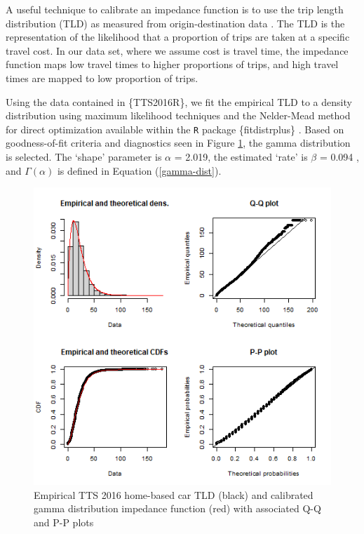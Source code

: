 \documentclass[Royal,times,sageh]{sagej}
\begin{document}
A useful technique to calibrate an impedance function is to use the trip
length distribution (TLD) as measured from origin-destination data
\citep{horbachov_theoretical_2018, batista_estimation_2019}. The TLD is
the representation of the likelihood that a proportion of trips are
taken at a specific travel cost. In our data set, where we assume cost
is travel time, the impedance function maps low travel times to higher
proportions of trips, and high travel times are mapped to low proportion
of trips.

Using the data contained in \{TTS2016R\}, we fit the empirical TLD to a
density distribution using maximum likelihood techniques and the
Nelder-Mead method for direct optimization available within the
\texttt{R} package \{fitdistrplus\} \citep{fitdistrplus_2015}. Based on
goodness-of-fit criteria and diagnostics seen in Figure
\ref{fig:TLD-Gamma-plot}, the gamma distribution is selected. The
`shape' parameter is \(\alpha\) = 2.019, the estimated `rate' is
\(\beta\) = 0.094 , and \(\Gamma(\alpha)\) is defined in Equation
(\ref{gamma-dist}).

\begin{figure}

{\centering \includegraphics[width=0.75\linewidth]{images/impedance_function} 

}

\caption{\label{fig:TLD-Gamma-plot}Empirical TTS 2016 home-based car TLD (black) and calibrated gamma distribution impedance function (red) with associated Q-Q and P-P plots}\label{fig:TLD-Gamma-plot}
\end{figure}
\end{document}
